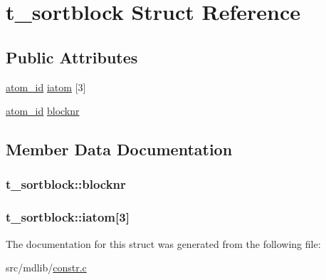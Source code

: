 \hypertarget{structt__sortblock}{\section{t\-\_\-sortblock \-Struct \-Reference}
\label{structt__sortblock}
}
\subsection*{\-Public \-Attributes}
\begin{DoxyCompactItemize}
\item 
\hyperlink{include_2types_2simple_8h_ad3f47cdb48677e516e2049719612c737}{atom\-\_\-id} \hyperlink{structt__sortblock_a06bf85779a56539cc395f628aea31b02}{iatom} \mbox{[}3\mbox{]}
\item 
\hyperlink{include_2types_2simple_8h_ad3f47cdb48677e516e2049719612c737}{atom\-\_\-id} \hyperlink{structt__sortblock_a3da0ffe315228c07bc458030dee21489}{blocknr}
\end{DoxyCompactItemize}


\subsection{\-Member \-Data \-Documentation}
\hypertarget{structt__sortblock_a3da0ffe315228c07bc458030dee21489}{
\subsubsection[{blocknr}]{ {\bf t\-\_\-sortblock\-::blocknr}}}\label{structt__sortblock_a3da0ffe315228c07bc458030dee21489}
\hypertarget{structt__sortblock_a06bf85779a56539cc395f628aea31b02}{
\subsubsection[{iatom}]{ {\bf t\-\_\-sortblock\-::iatom}\mbox{[}3\mbox{]}}}\label{structt__sortblock_a06bf85779a56539cc395f628aea31b02}


\-The documentation for this struct was generated from the following file\-:\begin{DoxyCompactItemize}
\item 
src/mdlib/\hyperlink{constr_8c}{constr.\-c}\end{DoxyCompactItemize}
